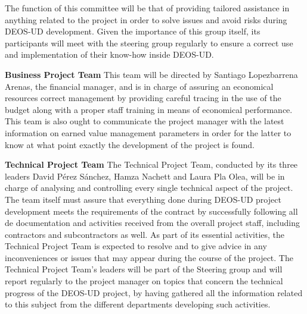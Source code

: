 The function of this committee will be that of providing tailored assistance in anything related to the project in order to solve issues and avoid risks during DEOS-UD development. Given the importance of this group itself, its participants will meet with the steering group regularly to ensure a correct use and implementation of their know-how inside DEOS-UD. 

\textbf{Business Project Team}
\newline
\newline
This team will be directed by Santiago Lopezbarrena Arenas, the financial manager, and is in charge of assuring an economical resources correct management by providing careful tracing in the use of the budget along with a proper staff training in means of economical performance. This team is also ought to communicate the project manager with the latest information on earned value management parameters in order for the latter to know at what point exactly the development of the project is found.   
 
\textbf{Technical Project Team}
\newline
\newline
The Technical Project Team, conducted by its three leaders David Pérez Sánchez, Hamza Nachett and Laura Pla Olea, will be in charge of analysing and controlling every single technical aspect of the project. The team itself must assure that everything done during DEOS-UD project development meets the requirements of the contract by successfully following all de documentation and activities received from the overall project staff, including contractors and subcontractors as well. As part of its essential activities, the Technical Project Team is expected to resolve and to give advice in any inconveniences or issues that may appear during the course of the project. 
The Technical Project Team’s leaders will be part of the Steering group and will report regularly to the project manager on topics that concern the technical progress of the DEOS-UD project, by having gathered all the information related to this subject from the different departments developing such activities. 

